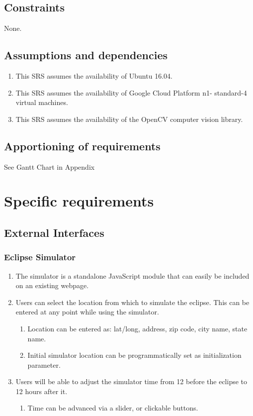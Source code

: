 \documentclass[10pt, onecolumn, draftclsnofoot, letterpaper, compsoc]{IEEEtran}
\begin{document}
\subsection{Constraints}
None.

\subsection{Assumptions and dependencies}
	\begin{enumerate}
		\item This SRS assumes the availability of Ubuntu 16.04.
		\item This SRS assumes the availability of Google Cloud Platform n1-
		standard-4 virtual machines.
		\item This SRS assumes the availability of the OpenCV computer 
		vision library.
	\end{enumerate}

\subsection{Apportioning of requirements}
See Gantt Chart in Appendix
	

\section{Specific requirements}

\subsection{External Interfaces}

\subsubsection{Eclipse Simulator}
	\begin{enumerate}
		\item The simulator is a standalone JavaScript module that can easily 
		be included on an existing webpage.

		\item Users can select the location from which to simulate the eclipse. 
		This can be entered at any point while using the simulator.
		\begin{enumerate}
			\item Location can be entered as: lat/long, address, zip code, city 
			name, state name.
			\item Initial simulator location can be programmatically set as 
			initialization parameter.
		\end{enumerate}

		\item Users will be able to adjust the simulator time from 12 before 
		the eclipse to 12 hours after it.
		\begin{enumerate}
			\item Time can be advanced via a slider, or clickable buttons.
		\end{enumerate}

	\end{enumerate}
\end{document}

